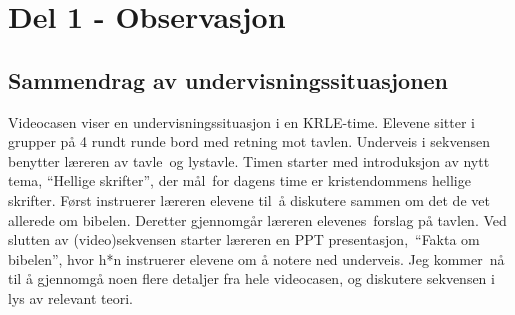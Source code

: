 \documentclass[12pt,twoside,onecolumn,norsk]{article}
\begin{document}
\section*{Del 1 - Observasjon}
\subsection*{Sammendrag av undervisningssituasjonen}
Videocasen viser en undervisningssituasjon i en KRLE-time. Elevene sitter i grupper 
på 4 rundt runde bord med retning mot tavlen. Underveis i sekvensen benytter læreren 
av tavle og lystavle. Timen starter med introduksjon av nytt tema, ``Hellige skrifter'', 
der mål for dagens time er kristendommens hellige skrifter. Først instruerer læreren 
elevene til å diskutere sammen om det de vet allerede om bibelen. Deretter gjennomgår 
læreren elevenes forslag på tavlen. Ved slutten av (video)sekvensen starter læreren 
en PPT presentasjon, ``Fakta om bibelen'', hvor h*n instruerer elevene om å notere ned 
underveis. Jeg kommer nå til å gjennomgå noen flere detaljer fra hele videocasen, og 
diskutere sekvensen i lys av relevant teori.
\end{document}
